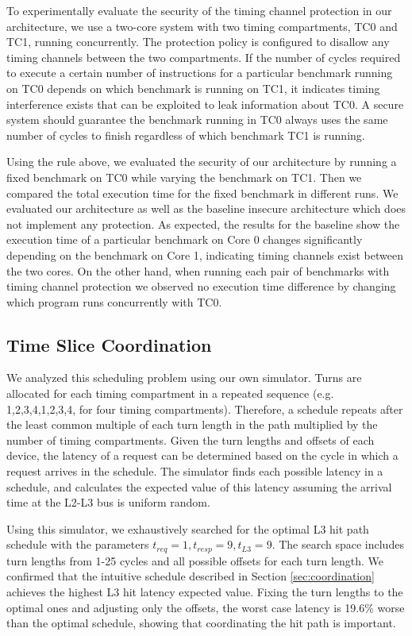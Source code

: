 To experimentally evaluate the security of the timing channel protection in our 
architecture, we use a two-core system with two timing compartments, TC0 and
TC1, running concurrently. The protection policy is configured to disallow any 
timing channels between the two compartments. If the number of cycles required 
to execute a certain number of instructions for a particular benchmark running on 
TC0 depends on which benchmark is running on TC1, it indicates timing 
interference exists that can be exploited to leak information about TC0. A 
secure system should guarantee the benchmark running in TC0 always uses the 
same number of cycles to finish regardless of which benchmark TC1 is running. 

Using the rule above, we evaluated the security of our architecture by running 
a fixed benchmark on TC0 while varying the benchmark on TC1. Then we compared 
the total execution time for the fixed benchmark in different runs. We 
evaluated our architecture as well as the baseline insecure architecture which 
does not implement any protection. As expected, the results for the baseline 
show the execution time of a particular benchmark on Core 0 changes significantly 
depending on the benchmark on Core 1, indicating timing channels exist between
the two cores. On the other hand, when running each pair of benchmarks with 
timing channel protection we observed no execution time difference by changing 
which program runs concurrently with TC0.

\subsection{Time Slice Coordination}
\label{sec:eval_coord}
We analyzed this scheduling problem using our own simulator.
Turns are allocated for each timing compartment in a repeated 
sequence (e.g. 1,2,3,4,1,2,3,4, for four timing compartments). Therefore, a 
schedule repeats after the least common multiple of each 
turn length in the path multiplied by the number of timing compartments. Given 
the turn lengths and offsets of each device, the latency of a request can be 
determined based on the cycle in which a request arrives in the schedule.
The simulator finds each possible latency in a schedule, and calculates the 
expected value of this latency assuming the arrival time at the L2-L3 bus is 
uniform random.

Using this simulator, we exhaustively searched for the optimal L3 hit path 
schedule with the parameters $t_{req}=1,t_{resp}=9,t_{L3}=9$. The 
search space includes turn lengths from 1-25 cycles and all possible offsets 
for each turn length. We confirmed that the intuitive schedule described in 
Section \ref{sec:coordination} achieves the highest L3 hit latency expected value.
Fixing the turn lengths to the optimal ones and adjusting only the offsets,
the worst case latency is 19.6\% worse than the optimal schedule, showing
that coordinating the hit path is important.

